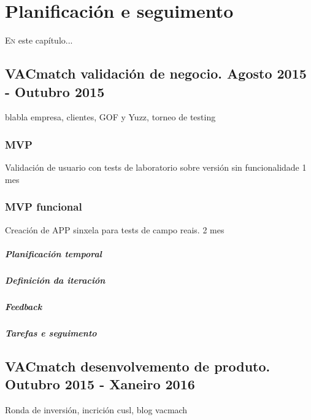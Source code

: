 \chapter{Planificación e seguimento}
\minitoc


  \lettrine{E}{n} este capítulo...

  \section{VACmatch validación de negocio. Agosto 2015 - Outubro 2015}
  blabla empresa, clientes, GOF y Yuzz, torneo de testing

    \subsection{MVP}
    Validación de usuario con tests de laboratorio sobre versión sin funcionalidade
    1 mes

    \subsection{MVP funcional}
    Creación de APP sinxela para tests de campo reais.
    2 mes
      \paragraph{Planificación temporal}
      \paragraph{Definición da iteración}
      \paragraph{Feedback}
      \paragraph{Tarefas e seguimento}

  \section{VACmatch desenvolvemento de produto. Outubro 2015 - Xaneiro 2016}
  Ronda de inversión, incrición cusl, blog vacmach

